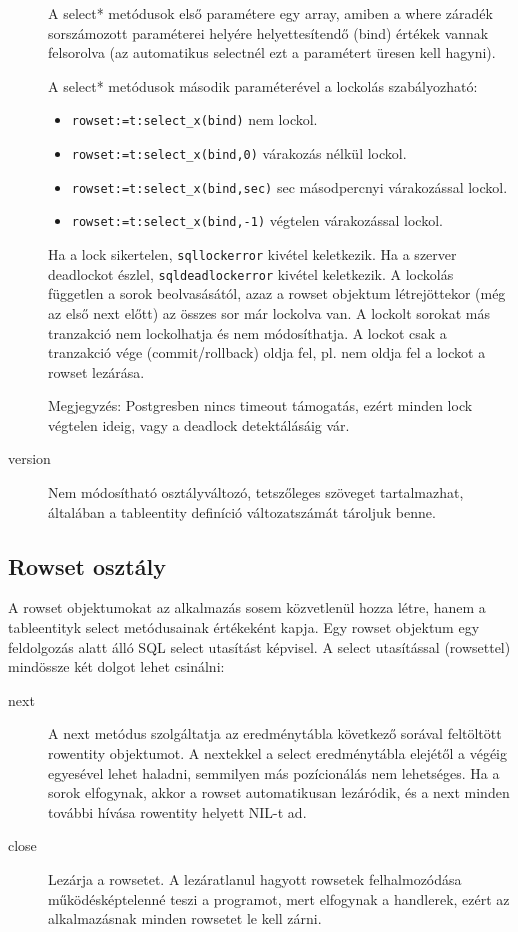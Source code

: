 \begin{description}
    A select* metódusok első paramétere egy array, amiben 
    a where záradék sorszámozott  paraméterei helyére
    helyettesítendő (bind) értékek vannak felsorolva (az automatikus
    selectnél ezt a paramétert üresen kell hagyni).
    
    A select* metódusok második paraméterével a lockolás
    szabályozható:
    \begin{itemize}
    \item   \verb!rowset:=t:select_x(bind)! nem lockol.
    \item   \verb!rowset:=t:select_x(bind,0)! várakozás nélkül lockol. 
    \item   \verb!rowset:=t:select_x(bind,sec)! sec másodpercnyi várakozással lockol. 
    \item   \verb!rowset:=t:select_x(bind,-1)! végtelen várakozással lockol. 
    \end{itemize}
    Ha a lock sikertelen, \verb!sqllockerror! kivétel keletkezik.
    Ha a szerver deadlockot észlel,  \verb!sqldeadlockerror! kivétel keletkezik.
    A lockolás független a sorok beolvasásától, azaz  a rowset objektum 
    létrejöttekor (még az első next előtt) az összes sor már lockolva van.
    A lockolt sorokat más tranzakció nem lockolhatja és nem módosíthatja. 
    A lockot csak a tranzakció vége (commit/rollback)  oldja fel, 
    pl. nem oldja fel a lockot a rowset lezárása.

    Megjegyzés: Postgresben nincs timeout támogatás, ezért
    minden lock végtelen ideig, vagy a deadlock detektálásáig vár.

\item[version]
    Nem módosítható osztályváltozó, tetszőleges szöveget tartalmazhat,
    általában a tableentity definíció változatszámát tároljuk benne.
\end{description}


\subsection{Rowset osztály}

A rowset objektumokat az alkalmazás sosem közvetlenül hozza létre,
hanem a tableentityk select metódusainak értékeként kapja.
Egy rowset objektum egy feldolgozás alatt álló SQL select utasítást
képvisel. A select utasítással (rowsettel) mindössze két dolgot lehet
csinálni:
\begin{description}
\item[next]
    A next metódus szolgáltatja az eredménytábla következő sorával feltöltött
    rowentity objektumot. A nextekkel a select eredménytábla elejétől
    a végéig egyesével lehet haladni, semmilyen más pozícionálás
    nem lehetséges. Ha a sorok elfogynak, akkor a rowset automatikusan
    lezáródik, és a next minden további hívása rowentity helyett NIL-t ad.
\item[close]
    Lezárja a rowsetet. A lezáratlanul hagyott rowsetek felhalmozódása
    működésképtelenné teszi a programot, mert elfogynak a handlerek,
    ezért az alkalmazásnak minden rowsetet le kell zárni.
\end{description}

